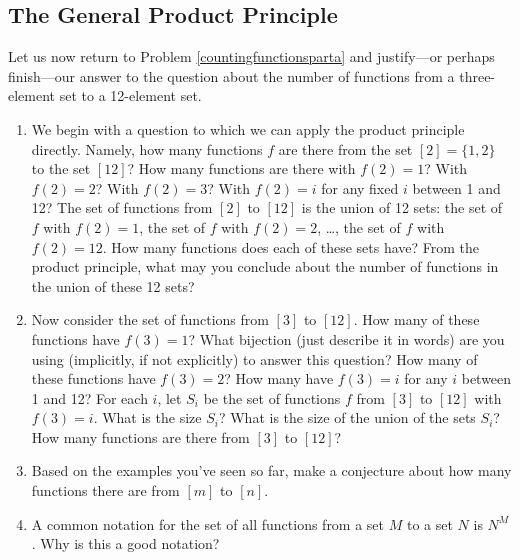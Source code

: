 \subsection{The  General Product Principle}
\iteme  Let us now return to Problem \ref{countingfunctionsparta} and
justify---or perhaps finish---our answer to the question about the
number of functions from a three-element set to a 12-element
set.\label{countingfunctions2}
\begin{enumerate}
\item We begin with a question to which we can apply the product
principle directly.  Namely, how many functions $f$ are there from the
set $[2]=\{1,2\}$ to the set $[12]$?  How many functions are there
with $f(2)=1$?  With $f(2) =2$?  With $f(2)=3$?  With $f(2) =i$ for
any fixed $i$ between 1 and 12?  The set of functions from $[2]$ to
$[12]$ is the union of 12 sets: the set of $f$ with $f(2)=1$, the set
of $f$ with $f(2) = 2$, \ldots, the set of $f$ with $f(2) = 12$.  How
many functions does each of these sets have?  From the product
principle, what may you conclude about the number of functions in the
union of these 12 sets?  
\item Now consider the set of functions from $[3]$ to $[12]$.  How
many of these functions have $f(3) =1$?  What bijection (just describe
it in words) are you using (implicitly, if not explicitly) to answer this
question?  How many of these functions have $f(3) =2$?  How many have $f(3) =
i$ for any
$i$ between 1 and 12?  For each $i$, let $S_i$ be the set of functions
$f$ from $[3]$ to $[12]$ with $f(3) = i$.  What is the size $S_i$? 
What is the size of the union of the sets $S_i$?  How many functions
are there from $[3]$ to $[12]$?
\item Based on the examples you've seen so far, make a conjecture
about how many functions there are from $[m]$ to
$[n]$.\label{numberoffunctionsconjecture}
\item A common notation for the set of all functions from a set $M$ to a
set $N$ is $N^M$.  Why is this a good notation? 
\end{enumerate}

